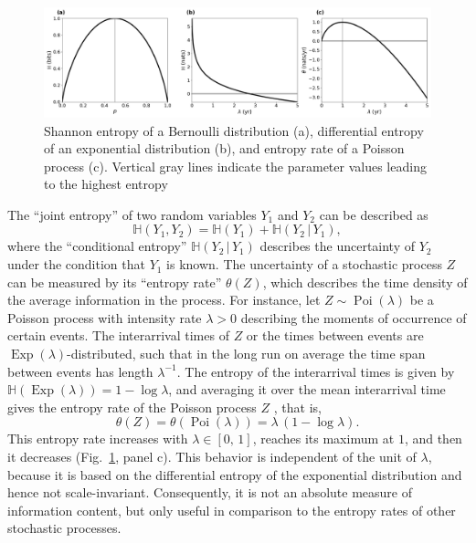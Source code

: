 \documentclass[smallextended]{svjour3}
\renewcommand{\H}{\mathbb{H}}
\newcommand{\Exp}{\operatorname{Exp}}
\newcommand{\Poi}{\operatorname{Poi}}
\newcommand{\ie}{that is}
\renewcommand{\emph}[1]{``#1''}
\begin{document}
\begin{figure}[htbp]
  \vspace{-0.6cm}
  \centering
  \includegraphics[width=1.0\linewidth]{figs/simple_entropy_py.png}
  \caption{
  Shannon entropy of a Bernoulli distribution (a), differential entropy of an exponential distribution (b), and entropy rate of a Poisson process (c).
  Vertical gray lines indicate the parameter values leading to the highest entropy
  }
  \label{fig:simple_entropy}
\end{figure}
The \emph{joint entropy} of two random variables $Y_1$ and $Y_2$ can be described as
\begin{equation}
  \H(Y_1,Y_2) = \H(Y_1) + \H(Y_2\,|\,Y_1),
\end{equation}
where the \emph{conditional entropy} $\H(Y_2\,|\,Y_1)$ describes the uncertainty of $Y_2$ under the condition that $Y_1$ is known.
The uncertainty of a stochastic process $Z$ can be measured by its \emph{entropy rate} $\theta(Z)$, which describes the time density of the average information in the process.
For instance, let $Z\sim\Poi(\lambda)$ be a Poisson process with intensity rate $\lambda>0$ describing the moments of occurrence of certain events.
The interarrival times of $Z$ or the times between events are $\Exp(\lambda)$-distributed, such that in the long run on average the time span between events has length $\lambda^{-1}$.
The entropy of the interarrival times is given by $\H(\Exp(\lambda))=1-\log \lambda$, and averaging it over the mean interarrival time gives the entropy rate of the Poisson process $Z$ \citep[Sect.~3.3]{Gaspard1993PR}, \ie,
\begin{equation}
  \theta(Z) = \theta(\Poi(\lambda)) = \lambda\,(1-\log \lambda).
\end{equation}
This entropy rate increases with $\lambda\in[0,\,1]$, reaches its maximum at $1$, and then it decreases (Fig.~\ref{fig:simple_entropy}, panel c).
This behavior is independent of the unit of $\lambda$, because it is based on the differential entropy of the exponential distribution and hence not scale-invariant.
Consequently, it is not an absolute measure of information content, but only useful in comparison to the entropy rates of other stochastic processes.
\end{document}
